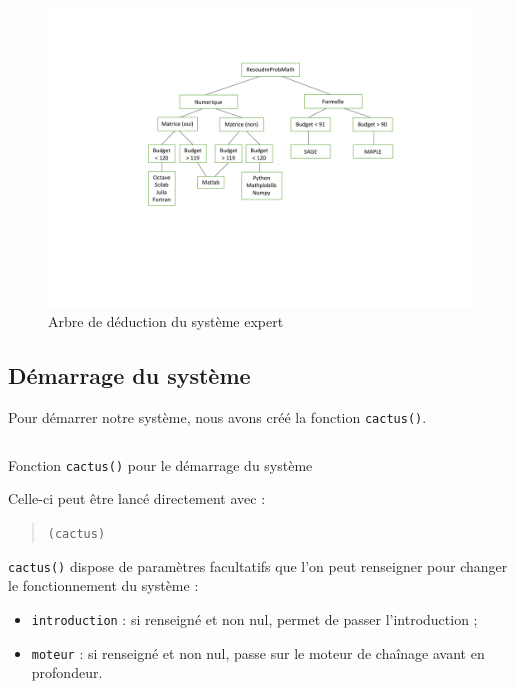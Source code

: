 \documentclass[a4paper,12pt]{article}
\begin{document}
	\begin{figure}[H]
		\centering
		\includegraphics[scale=0.5]{graph_deduction2.pdf}
		\caption{Arbre de déduction du système expert}
	\end{figure}

	\subsection{Démarrage du système}
	
	Pour démarrer notre système, nous avons créé la fonction \texttt{cactus()}.
	
\begin{listing}[H]
	\centering
	\inputminted[breaklines=true,linenos]{lisp}{../cactus.lisp}
	\caption{Fonction \texttt{cactus()} pour le démarrage du système}
\end{listing}

	Celle-ci peut être lancé directement avec :
	\begin{quotation}
	\texttt{(cactus)}
	\end{quotation}

	\texttt{cactus()} dispose de paramètres facultatifs que l'on peut renseigner pour changer le fonctionnement du système :
	
	\begin{itemize}
		\item \texttt{introduction} : si renseigné et non nul, permet de passer l'introduction ;
		\item \texttt{moteur} : si renseigné et non nul, passe sur le moteur de chaînage avant en profondeur.
	\end{itemize}
	
\end{document}
